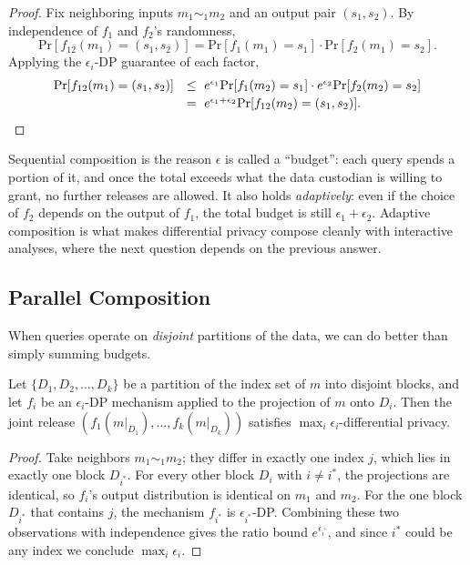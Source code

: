 \documentclass[11pt]{article}
\newcommand{\pr}{\mathrm{Pr}}
\begin{document}
\begin{proof}
Fix neighboring inputs $m_1 \sim_1 m_2$ and an output pair $(s_1, s_2)$.  By
independence of $f_1$ and $f_2$'s randomness,
\[
  \pr[f_{12}(m_1) = (s_1, s_2)] = \pr[f_1(m_1) = s_1] \cdot \pr[f_2(m_1) = s_2].
\]
Applying the $\epsilon_i$-DP guarantee of each factor,
\[
\begin{array}{rl}
  \pr[f_{12}(m_1) = (s_1, s_2)]
  &\leq\ e^{\epsilon_1}\pr[f_1(m_2) = s_1]\cdot e^{\epsilon_2}\pr[f_2(m_2) = s_2] \\[0.5ex]
  &=\ e^{\epsilon_1+\epsilon_2}\pr[f_{12}(m_2) = (s_1, s_2)]. \qedhere
\end{array}
\]
\end{proof}

Sequential composition is the reason $\epsilon$ is called a ``budget'': each
query spends a portion of it, and once the total exceeds what the data
custodian is willing to grant, no further releases are allowed.  It also
holds \emph{adaptively}: even if the choice of $f_2$ depends on the output of
$f_1$, the total budget is still $\epsilon_1 + \epsilon_2$.  Adaptive
composition is what makes differential privacy compose cleanly with
interactive analyses, where the next question depends on the previous
answer.

\subsection{Parallel Composition}

When queries operate on \emph{disjoint} partitions of the data, we can do
better than simply summing budgets.

\begin{theorem}
\label{thm:par-comp}
Let $\{D_1, D_2, \ldots, D_k\}$ be a partition of the index set of $m$ into
disjoint blocks, and let $f_i$ be an $\epsilon_i$-DP mechanism applied to
the projection of $m$ onto $D_i$.  Then the joint release
$(f_1(m|_{D_1}), \ldots, f_k(m|_{D_k}))$ satisfies
$\max_i \epsilon_i$-differential privacy.
\end{theorem}

\begin{proof}
Take neighbors $m_1 \sim_1 m_2$; they differ in exactly one index $j$, which
lies in exactly one block $D_{i^*}$.  For every other block $D_i$ with
$i \neq i^*$, the projections are identical, so $f_i$'s output distribution
is identical on $m_1$ and $m_2$.  For the one block $D_{i^*}$ that contains
$j$, the mechanism $f_{i^*}$ is $\epsilon_{i^*}$-DP.  Combining these two
observations with independence gives the ratio bound $e^{\epsilon_{i^*}}$,
and since $i^*$ could be any index we conclude $\max_i \epsilon_i$.
\end{proof}
\end{document}

